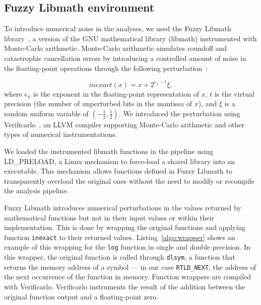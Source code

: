 \documentclass[11pt,onecolumn]{article}
\begin{document}
\subsection{Fuzzy Libmath environment}

To introduce numerical noise in the analyses, we used
the Fuzzy Libmath library~\cite{salari2021accurate}, a version of the GNU
mathematical library (libmath) instrumented with Monte-Carlo arithmetic.
Monte-Carlo arithmetic simulates roundoff and catastrophic cancellation
errors by introducing a controlled amount of noise in the floating-point
operations through the following perturbation~\cite{Parker1997-qq}:

\begin{equation} \label{eq:mca_inexact}
  inexact(x) = x + 2^{e_x-t}\xi,
\end{equation}
where $e_x$ is the exponent in the floating-point representation of $x$,
$t$ is the virtual precision (the number of unperturbed bits in the
mantissa of $x$), and $\xi$ is a random uniform variable of
$(-\frac{1}{2}, \frac{1}{2})$. We introduced the perturbation using 
Verificarlo~\cite{denis2015verificarlo}, an LLVM compiler supporting Monte-Carlo 
arithmetic and other types of numerical instrumentations.

We loaded the instrumented libmath functions in the pipeline using
LD\_PRELOAD, a Linux mechanism to force-load a shared library into an
executable. This mechanism allows functions defined in Fuzzy Libmath to transparently
overload the original ones without the need to modify or recompile the
analysis pipeline.

Fuzzy Libmath introduces numerical perturbations in the values returned by
mathematical functions but not in their input values or within their
implementation. This is done by wrapping the original functions and
applying function \texttt{inexact} to their returned values.
Listing~\ref{algo:wrapper} shows an example of this wrapping for the
\texttt{log} function in single and double precision. In this wrapper, the
original function is called through \texttt{dlsym}, a function that returns
the memory address of a symbol --- in our case \texttt{RTLD\_NEXT}, the
address of the next occurrence of the function in memory. Function wrappers
are compiled with Verificarlo. Verificarlo instruments the result of the
addition between the original function output and a floating-point zero.


\end{document}
